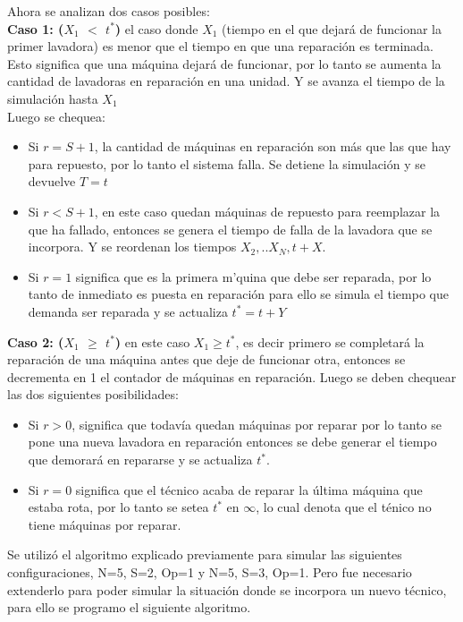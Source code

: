 \documentclass[11pt, spanish, a4paper]{article}
\begin{document}
Ahora se analizan dos casos posibles:\\
\textbf{Caso 1: ($X_1$ $<$ $t^*$)} el caso donde $X_1$ (tiempo en el que dejar\'a de funcionar la primer lavadora) es menor que el tiempo en que una reparaci\'on es terminada. Esto significa que una m\'aquina dejar\'a de funcionar, por lo tanto se aumenta la cantidad de lavadoras en reparaci\'on en una unidad. Y se avanza el tiempo de la simulaci\'on hasta $X_1$\\
Luego se chequea:
\begin{itemize}
\item Si $r = S+1$, la cantidad de m\'aquinas en reparaci\'on son m\'as que las que hay para repuesto, por lo tanto el sistema falla. Se detiene la simulaci\'on y se devuelve $T = t$
\item Si $r < S+1$, en este caso quedan m\'aquinas de repuesto para reemplazar la que ha fallado, entonces se genera el tiempo de falla de la lavadora que se incorpora. Y se reordenan los tiempos $X_2, .. X_N, t+X$.
\item Si $r = 1$ significa que es la primera m\a'quina que debe ser reparada, por lo tanto de inmediato es puesta en reparaci\'on para ello se simula el tiempo que demanda ser reparada y se actualiza $t^* = t+Y$
\end{itemize}
\textbf{Caso 2: ($X_1$ $\geq$ $t^*$)} en este caso $X_1 \geq t^*$, es decir primero se completar\'a la reparaci\'on de una m\'aquina antes que deje de funcionar otra, entonces se decrementa en 1 el contador de m\'aquinas en reparaci\'on. Luego se deben chequear las dos siguientes posibilidades:
\begin{itemize}
\item Si $ r > 0 $, significa que todav\'ia quedan m\'aquinas por reparar por lo tanto se pone una nueva lavadora en reparaci\'on entonces se debe generar el tiempo que demorar\'a en repararse y se actualiza $t^*$.
\item Si $r = 0$ significa que el t\'ecnico acaba de reparar la \'ultima m\'aquina que estaba rota, por lo tanto se setea $t^*$ en $\infty$, lo cual denota que el t\'enico no tiene m\'aquinas por reparar.
\end{itemize} 

Se utiliz\'o el algoritmo explicado previamente para simular las siguientes configuraciones, N=5, S=2, Op=1 y N=5, S=3, Op=1. Pero fue necesario extenderlo para poder simular la situaci\'on donde se incorpora un nuevo t\'ecnico, para ello se programo el siguiente algoritmo.\\
\end{document}

